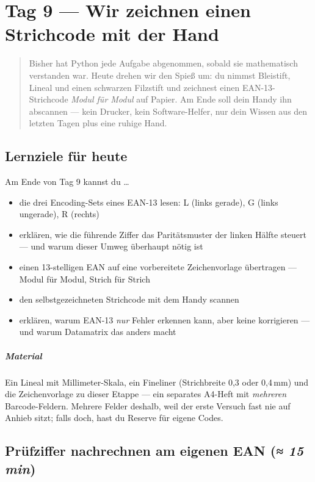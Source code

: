 \chapter{Tag 9 — Wir zeichnen einen Strichcode mit der Hand}

\begin{quote}
Bisher hat Python jede Aufgabe abgenommen, sobald sie mathematisch
verstanden war. Heute drehen wir den Spieß um: du nimmst Bleistift,
Lineal und einen schwarzen Filzstift und zeichnest einen
EAN-13-Strichcode \emph{Modul für Modul} auf Papier. Am Ende soll
dein Handy ihn abscannen — kein Drucker, kein Software-Helfer,
nur dein Wissen aus den letzten Tagen plus eine ruhige Hand.
\end{quote}

\section*{Lernziele für heute}

Am Ende von Tag 9 kannst du \dots

\begin{itemize}
\item die drei Encoding-Sets eines EAN-13 lesen: L (links gerade), G
  (links ungerade), R (rechts)
\item erklären, wie die führende Ziffer das Paritätsmuster der linken
  Hälfte steuert — und warum dieser Umweg überhaupt nötig ist
\item einen 13-stelligen EAN auf eine vorbereitete Zeichenvorlage
  übertragen — Modul für Modul, Strich für Strich
\item den selbstgezeichneten Strichcode mit dem Handy scannen
\item erklären, warum EAN-13 \emph{nur} Fehler erkennen kann, aber
  keine korrigieren — und warum Datamatrix das anders macht
\end{itemize}

\paragraph{Material} Ein Lineal mit Millimeter-Skala, ein Fineliner
(Strichbreite 0{,}3 oder 0{,}4\,mm) und die Zeichenvorlage zu dieser
Etappe — ein separates A4-Heft mit \emph{mehreren} Barcode-Feldern.
Mehrere Felder deshalb, weil der erste Versuch fast nie auf Anhieb
sitzt; falls doch, hast du Reserve für eigene Codes.

\section{Prüfziffer nachrechnen am eigenen EAN \normalfont(\textit{≈ 15 min})}

